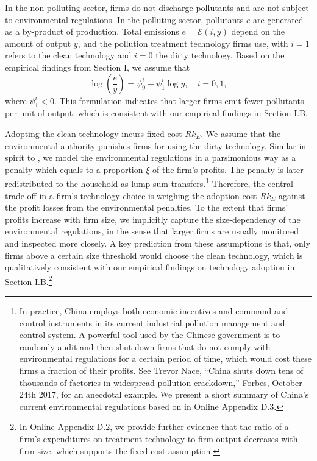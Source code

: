 \documentclass[AEJ]{AEA}
\begin{document}
In the non-polluting sector, firms do not discharge pollutants and are not subject to environmental regulations. In the polluting sector, pollutants $e$ are generated as a by-product of production. Total emissions $e = \mathcal{E}(i,y)$ depend on the amount of output $y$, and the pollution treatment technology firms use, with $i = 1$ refers to the {clean} technology and $i = 0$ the dirty technology. Based on the empirical findings from Section I, we assume that
\begin{equation}
\label{eq:intensity_size}
    \log\left(\frac{e}{y}\right) = \psi_0^i + \psi_1^i \log y, \quad i = 0,1,
\end{equation}
where $\psi_1^i<0$. This formulation indicates that larger firms emit fewer pollutants per unit of output, which is consistent with our empirical findings in Section I.B.

Adopting the clean technology incurs fixed cost $R k_E$. We assume that the environmental authority punishes firms for using the dirty technology. Similar in spirit to \citet{ShapiroWalker:2015}, we model the environmental regulations in a parsimonious way as a penalty which equals to a proportion $\xi$ of the firm's profits. The penalty is later redistributed to the household as lump-sum transfers.\footnote{In practice, China employs both economic incentives and command-and-control instruments in its current industrial pollution management and control system. A powerful tool used by the Chinese government is to randomly audit and then shut down firms that do not comply with environmental regulations for a certain period of time, which would cost these firms a fraction of their profits. See Trevor Nace, ``China shuts down tens of thousands of factories in widespread pollution crackdown,'' Forbes, October 24th 2017, for an anecdotal example.  We present a short summary of China's current environmental regulations based on \citet{Lin:2013} in Online Appendix D.3.} Therefore, the central trade-off in a firm's technology choice is weighing the adoption cost $R k_E$ against the profit losses from the environmental penalties. To the extent that firms' profits increase with firm size, we implicitly capture the size-dependency of the environmental regulations, in the sense that larger firms are usually monitored and inspected more closely. A key prediction from these assumptions is that, only firms above a certain size threshold would choose the clean technology, which is qualitatively consistent with our empirical findings on technology adoption in Section I.B.\footnote{In Online Appendix D.2, we provide further evidence that the ratio of a firm's expenditures on treatment technology to firm output decreases with firm size, which supports the fixed cost assumption.}
\end{document}
